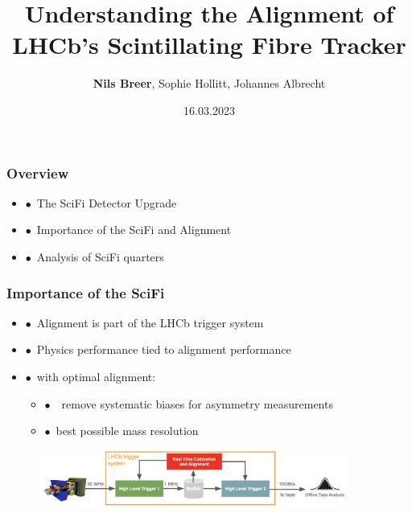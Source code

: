 \documentclass[aspectratio=1610, 12pt]{beamer}
\title{Understanding the Alignment of LHCb's Scintillating Fibre Tracker}
\author[N.Breer]{\textbf{Nils Breer}, Sophie Hollitt, Johannes Albrecht}
\institute{DPG spring Conference, Dresden}
\date{16.03.2023}
\begin{document}
\maketitle

\begin{frame}\frametitle{Overview}
  \begin{itemize}
    \item $\bullet$\, The SciFi Detector Upgrade
    \item $\bullet$\, Importance of the SciFi and Alignment
    \item $\bullet$\, Analysis of SciFi quarters
  \end{itemize}
\end{frame}

\begin{frame}\frametitle{Importance of the SciFi}
  \begin{itemize}
    \item $\bullet$\, Alignment is part of the LHCb trigger system
    \item $\bullet$\, Physics performance tied to alignment performance
    \item $\bullet$\, with optimal alignment:
    \begin{itemize}
      \item $\bullet$\, \to\, remove systematic biases for asymmetry measurements
      \item $\bullet$\, best possible mass resolution
    \end{itemize}
  \end{itemize}
  \begin{figure}
      \includegraphics[width=0.9\textwidth]{logos/dataflow.png}%
  \end{figure}
\end{frame}
\end{document}
